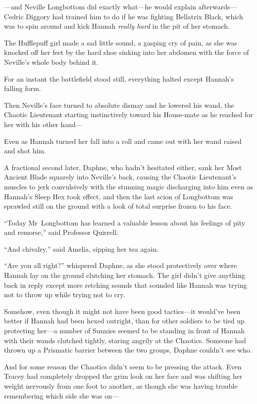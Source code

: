 —and Neville Longbottom did exactly what—he would explain afterwards—Cedric Diggory had trained him to do if he was fighting Bellatrix Black, which was to spin around and kick Hannah \emph{really hard} in the pit of her stomach.

The Hufflepuff girl made a sad little sound, a gasping cry of pain, as she was knocked off her feet by the hard shoe sinking into her abdomen with the force of Neville’s whole body behind it.

For an instant the battlefield stood still, everything halted except Hannah’s falling form.

Then Neville’s face turned to absolute dismay and he lowered his wand, the Chaotic Lieutenant starting instinctively toward his House-mate as he reached for her with his other hand—

Even as Hannah turned her fall into a roll and came out with her wand raised and shot him.

A fractional second later, Daphne, who hadn’t hesitated either, sank her Most Ancient Blade squarely into Neville’s back, causing the Chaotic Lieutenant’s muscles to jerk convulsively with the stunning magic discharging into him even as Hannah’s Sleep Hex took effect, and then the last scion of Longbottom was sprawled still on the ground with a look of total surprise frozen to his face.

\later

“Today Mr~Longbottom has learned a valuable lesson about his feelings of pity and remorse,” said Professor Quirrell.

“And chivalry,” said Amelia, sipping her tea again.

\later

“Are you all right?” whispered Daphne, as she stood protectively over where Hannah lay on the ground clutching her stomach. The girl didn’t give anything back in reply except more retching sounds that sounded like Hannah was trying not to throw up while trying not to cry.

Somehow, even though it might not have been good tactics—it would’ve been better if Hannah had been hexed outright, than for other soldiers to be tied up protecting her—a number of Sunnies seemed to be standing in front of Hannah with their wands clutched tightly, staring angrily at the Chaotics. Someone had thrown up a Prismatic barrier between the two groups, Daphne couldn’t see who.

And for some reason the Chaotics didn’t seem to be pressing the attack. Even Tracey had completely dropped the grim look on her face and was shifting her weight nervously from one foot to another, as though she was having trouble remembering which side she was on—

